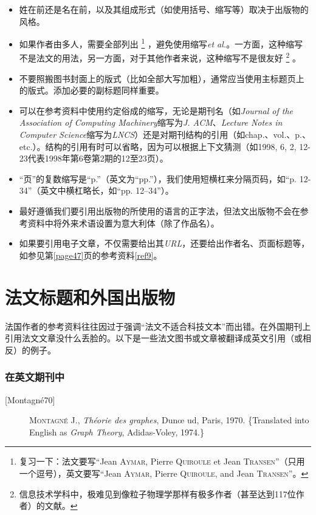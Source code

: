 \begin{itemize}
    \item 姓在前还是名在前，以及其组成形式（如使用括号、缩写等）取决于出版物的风格。
    \item 如果作者由多人，需要全部列出
        \footnote{复习一下：法文要写``Jean \textsc{Aymar}, Pierre \textsc{Quiroule} et Jean \textsc{Transen}''（只用一个逗号），英文要写``Jean \textsc{Aymar}, Pierre \textsc{Quiroule}, and Jean \textsc{Transen}''。}
    ，避免使用缩写\emph{et al.}。一方面，这种缩写不是法文的用法，另一方面，对于其他作者来说，这种缩写不是很友好
        \footnote{信息技术学科中，极难见到像粒子物理学那样有极多作者（甚至达到117位作者）的文献。}
    。
    \item 不要照搬图书封面上的版式（比如全部大写加粗），通常应当使用主标题页上的版式。添加必要的副标题同样重要。
    \item 可以在参考资料中使用约定俗成的缩写，无论是期刊名（如\emph{Journal of the Association of Computing Machinery}缩写为\emph{J. ACM}、\emph{Lecture Notes in Computer Science}缩写为\emph{LNCS}）还是对期刊结构的引用（如chap.、vol.、p.、etc.）。结构的引用有时可以省略，因为可以根据上下文猜测（如1998, 6, 2, 12-23代表1998年第6卷第2期的12至23页）。
    \item ``页''的复数缩写是``p.''（英文为``pp.''），我们使用短横杠来分隔页码，如``p. 12-34''（英文中横杠略长，如``pp. 12--34''）。
    \item 最好遵循我们要引用出版物的所使用的语言的正字法，但法文出版物不会在参考资料中将外来术语设置为意大利体（除了作品名）。
    \item 如果要引用电子文章，不仅需要给出其\emph{URL}，还要给出作者名、页面标题等，如参见第\ref{page47}页的参考资料\ref{ref9}。%
\end{itemize}

\section{法文标题和外国出版物}

法国作者的参考资料往往因过于强调``法文不适合科技文本''而出错。在外国期刊上引用法文文章没什么丢脸的。以下是一些法文图书或文章被翻译成英文引用（或相反）的例子。

\subsubsection*{在英文期刊中}

\begin{description}
    \item[{[Montagné70]}] \textsc{Montagné} J., \emph{Théorie des graphes}, Dunœ ud, Paris, 1970. \{Translated into English as \emph{Graph Theory}, Adidas-Voley, 1974.\}
\end{description}


